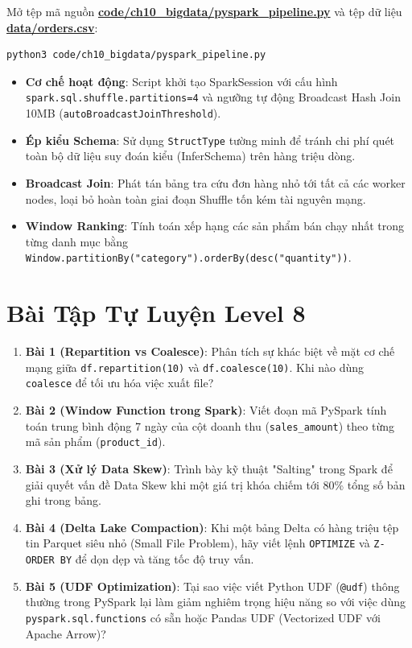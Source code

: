 \begin{handsonlabbox}
Mở tệp mã nguồn \href{run:./code/ch10_bigdata/pyspark_pipeline.py}{\textbf{code/ch10\_bigdata/pyspark\_pipeline.py}} và tệp dữ liệu \href{run:./data/orders.csv}{\textbf{data/orders.csv}}:
\begin{lstlisting}[language=bash]
python3 code/ch10_bigdata/pyspark_pipeline.py
\end{lstlisting}
\begin{itemize}
    \item \textbf{Cơ chế hoạt động}: Script khởi tạo SparkSession với cấu hình \texttt{spark.sql.shuffle.partitions=4} và ngưỡng tự động Broadcast Hash Join 10MB (\texttt{autoBroadcastJoinThreshold}).
    \item \textbf{Ép kiểu Schema}: Sử dụng \texttt{StructType} tường minh để tránh chi phí quét toàn bộ dữ liệu suy đoán kiểu (InferSchema) trên hàng triệu dòng.
    \item \textbf{Broadcast Join}: Phát tán bảng tra cứu đơn hàng nhỏ tới tất cả các worker nodes, loại bỏ hoàn toàn giai đoạn Shuffle tốn kém tài nguyên mạng.
    \item \textbf{Window Ranking}: Tính toán xếp hạng các sản phẩm bán chạy nhất trong từng danh mục bằng \texttt{Window.partitionBy("category").orderBy(desc("quantity"))}.
\end{itemize}
\end{handsonlabbox}

\section{Bài Tập Tự Luyện Level 8}

\begin{baitapbox}
\begin{enumerate}
    \item \textbf{Bài 1 (Repartition vs Coalesce)}: Phân tích sự khác biệt về mặt cơ chế mạng giữa \texttt{df.repartition(10)} và \texttt{df.coalesce(10)}. Khi nào dùng \texttt{coalesce} để tối ưu hóa việc xuất file?
    \item \textbf{Bài 2 (Window Function trong Spark)}: Viết đoạn mã PySpark tính toán trung bình động 7 ngày của cột doanh thu (\texttt{sales\_amount}) theo từng mã sản phẩm (\texttt{product\_id}).
    \item \textbf{Bài 3 (Xử lý Data Skew)}: Trình bày kỹ thuật "Salting" trong Spark để giải quyết vấn đề Data Skew khi một giá trị khóa chiếm tới 80\% tổng số bản ghi trong bảng.
    \item \textbf{Bài 4 (Delta Lake Compaction)}: Khi một bảng Delta có hàng triệu tệp tin Parquet siêu nhỏ (Small File Problem), hãy viết lệnh \texttt{OPTIMIZE} và \texttt{Z-ORDER BY} để dọn dẹp và tăng tốc độ truy vấn.
    \item \textbf{Bài 5 (UDF Optimization)}: Tại sao việc viết Python UDF (\texttt{@udf}) thông thường trong PySpark lại làm giảm nghiêm trọng hiệu năng so với việc dùng \texttt{pyspark.sql.functions} có sẵn hoặc Pandas UDF (Vectorized UDF với Apache Arrow)?
\end{enumerate}
\end{baitapbox}

